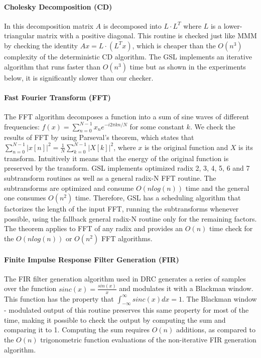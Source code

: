 \documentclass{sig-alternate}
\begin{document}
{\vspace{-5pt}
\paragraph{Cholesky Decomposition (CD)}
In this decomposition matrix $A$ is decomposed into $L \cdot L^T$ where $L$ is a lower-triangular matrix with a positive diagonal.
This routine is checked just like MMM by checking the identity $Ax = L \cdot (L^T x)$, which is cheaper than the $O(n^3)$ complexity of the deterministic CD algorithm.
The GSL implements an iterative algorithm that runs faster than $O(n^3)$ time but as shown in the experiments below, it is significantly slower than our checker.

\vspace{-5pt}
\paragraph{Fast Fourier Transform (FFT)}
The FFT algorithm decomposes a function into a sum of sine waves of different frequencies: $f(x) = \sum_{n=0}^{N-1} x_n e^{-i2\pi k n / N}$ for some constant $k$.
We check the results of FFT by using Parseval's theorem, which states that $\sum_{n=0}^{N-1} \left| x[n] \right|^2 = \frac{1}{N} \sum_{k=0}^{N-1} \left| X[k] \right|^2$, where $x$ is the original function and $X$ is its transform.
Intuitively it means that the energy of the original function is preserved by the transform.
GSL implements optimized radix 2, 3, 4, 5, 6 and 7 subtransform routines as well as a general radix-N FFT routine. The subtransforms are optimized and consume $O(n log(n))$ time and the general one consumes $O(n^2)$ time. Therefore, GSL has a scheduling algorithm that factorizes the length of the input FFT, running the subtransforms whenever possible, using the fallback general radix-N routine only for the remaining factors.
The theorem applies to FFT of any radix and provides an $O(n)$ time check for the $O(n log(n))$ or $O(n^2)$ FFT algorithms.

\vspace{-5pt}
\paragraph{Finite Impulse Response Filter Generation (FIR)}
The FIR filter generation algorithm used in DRC generates a series of samples over the function $sinc(x)=\frac{sin(x)}{x}$
and modulates it with a Blackman window.
This function has the property that $\int_{-\infty}^{\infty} sinc(x)dx = 1$.
The Blackman window - modulated output of this routine preserves this same property for most of the time, making it possible to check the output by computing the sum and comparing it to 1.
Computing the sum requires $O(n)$ additions, as compared to the $O(n)$ trigonometric function evaluations of the non-iterative FIR generation algorithm.

}
\end{document}
